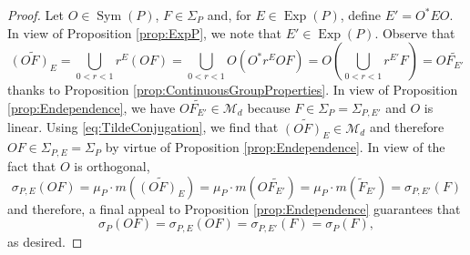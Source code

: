 \documentclass[11pt]{article}
\theoremstyle{remark}
\newcommand\Sym{\operatorname{Sym}}
\newcommand\Exp{\operatorname{Exp}}
\begin{document}
\begin{proof}
Let $O\in\Sym(P)$, $F\in\Sigma_P$ and, for $E\in \Exp(P)$, define $E'=O^* EO$. In view of Proposition \ref{prop:ExpP}, we note that $E'\in \Exp(P)$. Observe that
\begin{equation}\label{eq:TildeConjugation}
    \widetilde{(OF)_E}=\bigcup_{0<r<1}r^E (OF)=\bigcup_{0<r<1}O\left(O^* r^E O F\right)=O\left(\bigcup_{0<r<1} r^{E'}F\right)=O \widetilde{F_{E'}}
\end{equation}
thanks to Proposition \ref{prop:ContinuousGroupProperties}.
In view of Proposition \ref{prop:Endependence}, we have $O\widetilde{F_{E'}}\in \mathcal{M}_d$ because $F\in \Sigma_P=\Sigma_{P,E'}$ and $O$ is linear. Using \eqref{eq:TildeConjugation}, we find that $\widetilde{(OF)_E}\in\mathcal{M}_d$ and therefore  $OF\in\Sigma_{P,E}=\Sigma_P$ by virtue of Proposition \ref{prop:Endependence}. In view of the fact that $O$ is orthogonal,
\begin{equation*}
\sigma_{P,E}(OF)=\mu_P\cdot m\left(\widetilde{(OF)_E}\right)=\mu_P\cdot m\left(O \widetilde{F_{E'}}\right)=\mu_P\cdot m\left(\widetilde{F}_{E'}\right)=\sigma_{P,E'}(F)
\end{equation*}
and therefore, a final appeal to Proposition \ref{prop:Endependence} guarantees that
\begin{equation*}
    \sigma_P(OF)=\sigma_{P,E}(OF)=\sigma_{P,E'}(F)=\sigma_P(F),
\end{equation*}
as desired.

\end{proof}
\end{document}
